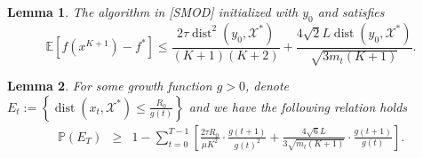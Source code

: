 \documentclass{article}
\newcommand{\assign}{:=}
\newcommand{\cdummy}{\cdot}
\newcommand{\tmop}[1]{\ensuremath{\operatorname{#1}}}
\newtheorem{lemma}{Lemma}
{\theorembodyfont{\rmfamily}\newtheorem{remark}{Remark}}
\begin{document}
\begin{lemma}
  The algorithm in [SMOD] initialized with $y_0$ and satisfies
  \[ \mathbb{E} [f (x^{K + 1}) - f^{\ast}] \leq \frac{2 \tau \tmop{dist}^2
     (y_0, \mathcal{X}^{\ast})}{ (K + 1) (K + 2)} + \frac{4 \sqrt{2} L
     \tmop{dist} (y_0, \mathcal{X}^{\ast})}{\sqrt{3 m_t (K + 1)}} . \]
\end{lemma}

\begin{lemma}
  For some growth function $g > 0$, denote $E_t \assign \left\{ \tmop{dist}
  (x_t, \mathcal{X}^{\ast}) \leq \frac{R_0}{g (t)} \right\}$ and we have the
  following relation holds
  \begin{eqnarray*}
    \mathbb{P} (E_T) & \geq & 1 - \sum_{t = 0}^{T - 1} \left[ \frac{2 \tau
    R_0}{\mu K^2} \cdummy \frac{g (t + 1)}{g (t)^2} + \frac{4 \sqrt{6} L}{3
    \sqrt{m_t  (K + 1)}} \cdummy \frac{g (t + 1)}{g (t)} \right] .
  \end{eqnarray*}
\end{lemma}
\end{document}
